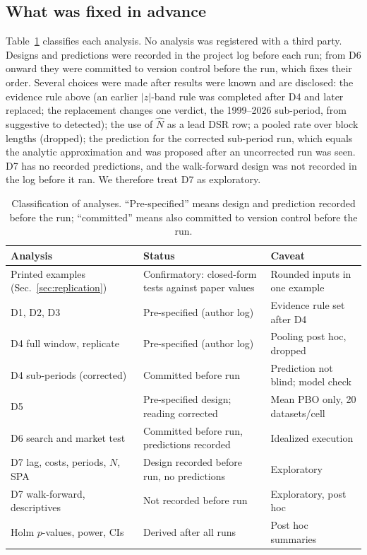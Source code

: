 \documentclass[11pt,a4paper]{article}
\theoremstyle{remark}
\begin{document}
\subsection{What was fixed in advance}\label{sec:prereg}
Table~\ref{tab:classification} classifies each analysis. No analysis was registered with a third party. Designs and predictions were recorded in the project log before each run; from D6 onward they were committed to version control before the run, which fixes their order. Several choices were made after results were known and are disclosed: the evidence rule above (an earlier $|z|$-band rule was completed after D4 and later replaced; the replacement changes one verdict, the 1999--2026 sub-period, from suggestive to detected); the use of $\hat N$ as a lead DSR row; a pooled rate over block lengths (dropped); the prediction for the corrected sub-period run, which equals the analytic approximation and was proposed after an uncorrected run was seen. D7 has no recorded predictions, and the walk-forward design was not recorded in the log before it ran. We therefore treat D7 as exploratory.

\begin{table}[t]
\centering\small
\caption{Classification of analyses. ``Pre-specified'' means design and prediction recorded before the run; ``committed'' means also committed to version control before the run.}\label{tab:classification}
\begin{tabularx}{\textwidth}{@{}l>{\raggedright\arraybackslash}X>{\raggedright\arraybackslash}p{4.6cm}@{}}
\toprule
Analysis & Status & Caveat \\
\midrule
Printed examples (Sec.~\ref{sec:replication}) & Confirmatory: closed-form tests against paper values & Rounded inputs in one example \\
D1, D2, D3 & Pre-specified (author log) & Evidence rule set after D4 \\
D4 full window, replicate & Pre-specified (author log) & Pooling post hoc, dropped \\
D4 sub-periods (corrected) & Committed before run & Prediction not blind; model check \\
D5 & Pre-specified design; reading corrected & Mean PBO only, 20 datasets/cell \\
D6 search and market test & Committed before run, predictions recorded & Idealized execution \\
D7 lag, costs, periods, $N$, SPA & Design recorded before run, no predictions & Exploratory \\
D7 walk-forward, descriptives & Not recorded before run & Exploratory, post hoc \\
Holm $p$-values, power, CIs & Derived after all runs & Post hoc summaries \\
\bottomrule
\end{tabularx}
\end{table}
\end{document}
